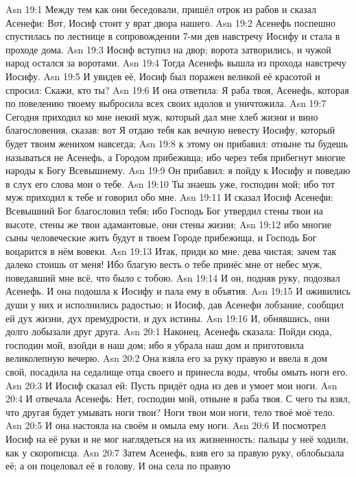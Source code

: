 \vs Asn 19:1
Между тем как они
беседовали, пришёл отрок из рабов и сказал Асенефи: Вот, Иосиф стоит у врат
двора нашего.
\vs Asn 19:2
Асенефь поспешно спустилась
по лестнице в сопровождении 7-ми дев навстречу Иосифу и стала в проходе дома.
\vs Asn 19:3
Иосиф вступил на двор;
ворота затворились, и чужой народ остался за воротами.
\vs Asn 19:4
Тогда Асенефь вышла из
прохода навстречу Иосифу.
\vs Asn 19:5
И увидев её, Иосиф был
поражен великой её красотой и спросил: Скажи, кто ты?
\vs Asn 19:6
И она ответила: Я раба
твоя, Асенефь, которая по повелению твоему выбросила всех своих идолов и
уничтожила.
\vs Asn 19:7
Сегодня приходил ко мне
некий муж, который дал мне хлеб жизни и вино благословения, сказав: вот Я отдаю
тебя как вечную невесту Иосифу, который будет твоим женихом навсегда;
\vs Asn 19:8
к этому он прибавил: отныне
ты будешь называться не Асенефь, а Городом прибежища; ибо через тебя
прибегнут многие народы к Богу Всевышнему.
\vs Asn 19:9
Он прибавил: я пойду к
Иосифу и поведаю в слух его слова мои о тебе.
\vs Asn 19:10
Ты знаешь уже, господин
мой; ибо тот муж приходил к тебе и говорил обо мне.
\vs Asn 19:11
И сказал Иосиф Асенефи:
Всевышний Бог благословил тебя; ибо Господь Бог утвердил стены твои на высоте,
стены же твои адамантовые, они стены жизни;
\vs Asn 19:12
ибо многие сыны
человеческие жить будут в твоем Городе прибежища, и Господь Бог воцарится в
нём вовеки.
\vs Asn 19:13
Итак, приди ко мне, дева
чистая; зачем так далеко стоишь от меня! Ибо благую весть о тебе принёс мне от
небес муж, поведавший мне всё, что было с тобою.
\vs Asn 19:14
И он, подняв руку, подозвал
Асенефь. И она подошла к Иосифу и пала ему в объятия.
\vs Asn 19:15
И оживились души у них и
исполнились радостью; и Иосиф, дав Асенефи лобзание, сообщил ей дух жизни, дух
премудрости, и дух истины.
\vs Asn 19:16
И, обнявшись, они долго
лобызали друг друга.
\vs Asn 20:1
Наконец, Асенефь сказала:
Пойди сюда, господин мой, взойди в наш дом; ибо я убрала наш дом и приготовила
великолепную вечерю.
\vs Asn 20:2
Она взяла его за руку правую
и ввела в дом свой, посадила на седалище отца своего и принесла воды, чтобы
омыть ноги его.
\vs Asn 20:3
И Иосиф сказал ей: Пусть
придёт одна из дев и умоет мои ноги.
\vs Asn 20:4
И отвечала Асенефь: Нет,
господин мой, отныне я раба твоя. С чего ты взял, что другая будет умывать
ноги твои? Ноги твои мои ноги, тело твоё моё тело.
\vs Asn 20:5
И она настояла на своём и
омыла ему ноги.
\vs Asn 20:6
И посмотрел Иосиф на её руки
и не мог наглядеться на их жизненность: пальцы у неё ходили, как у скорописца.
\vs Asn 20:7
Затем Асенефь, взяв его за
правую руку, облобызала её; а он поцеловал её в голову. И она села по правую
